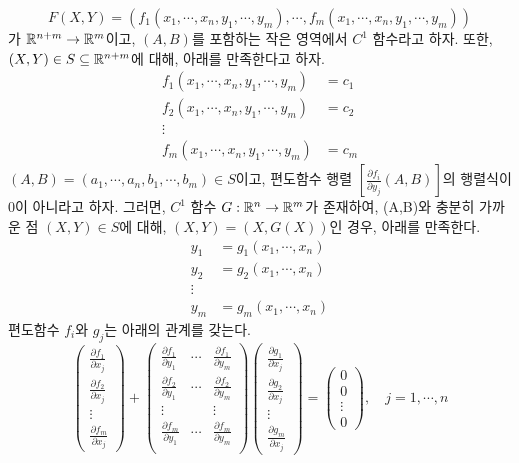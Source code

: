 \begin{theorem}
$$
F(X,Y)=(f_1(x_1,\cdots,x_n,y_1,\cdots,y_m),\cdots,f_m(x_1,\cdots,x_n,y_1,\cdots,y_m))
$$
가 $\mathbb{R}^{n+m} \to \mathbb{R}^m$이고, $(A,B)$를 포함하는 작은 영역에서 $C^1$ 함수라고 하자. 또한, $(X,Y) \in S \subseteq \mathbb{R}^{n+m}$에 대해, 아래를 만족한다고 하자.
\begin{align*}
f_1(x_1,\cdots,x_n,y_1,\cdots,y_m) &= c_1\\
f_2(x_1,\cdots,x_n,y_1,\cdots,y_m) &= c_2\\
\vdots\\
f_m(x_1,\cdots,x_n,y_1,\cdots,y_m) &= c_m
\end{align*}
$(A,B)=(a_1,\cdots,a_n,b_1,\cdots,b_m) \in S$이고, 편도함수 행렬 $[\frac{\partial f_i}{\partial y_j}(A,B)]$의 행렬식이 0이 아니라고 하자. 그러면, $C^1$ 함수 $G: \mathbb{R}^n \to \mathbb{R}^m$가 존재하여, (A,B)와 충분히 가까운 점 $(X,Y) \in S$에 대해, $(X,Y)=(X,G(X))$인 경우, 아래를 만족한다.
\begin{align*}
y_1 &= g_1(x_1,\cdots,x_n)\\
y_2 &= g_2(x_1,\cdots,x_n)\\
\vdots\\
y_m &= g_m(x_1,\cdots,x_n)
\end{align*}
편도함수 $f_i$와 $g_j$는 아래의 관계를 갖는다.
\begin{equation*}
    \begin{pmatrix}
        \frac{\partial f_1}{\partial x_j} \\
        \frac{\partial f_2}{\partial x_j} \\
        \vdots \\
        \frac{\partial f_m}{\partial x_j}
    \end{pmatrix}
    +
    \begin{pmatrix}
        \frac{\partial f_1}{\partial y_1} & \cdots & \frac{\partial f_1}{\partial y_m}\\
        \frac{\partial f_2}{\partial y_1} & \cdots & \frac{\partial f_2}{\partial y_m}\\
        \vdots &  & \vdots \\
        \frac{\partial f_m}{\partial y_1} & \cdots & \frac{\partial f_m}{\partial y_m}\\
    \end{pmatrix}
    \begin{pmatrix}
        \frac{\partial g_1}{\partial x_j} \\
        \frac{\partial g_2}{\partial x_j} \\
        \vdots \\
        \frac{\partial g_m}{\partial x_j}
    \end{pmatrix}
    =
    \begin{pmatrix}
        0 \\
        0 \\
        \vdots \\
        0
    \end{pmatrix}
    ,\quad
    j=1,\cdots,n
\end{equation*}
\end{theorem}

